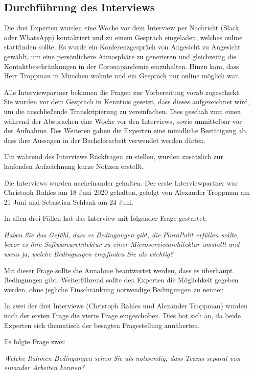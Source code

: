 \subsection{Durchführung des Interviews}

Die drei Experten wurden eine Woche vor dem Interview per Nachricht (Slack, oder WhatsApp) kontaktiert und zu einem Gespräch eingeladen, welches online stattfinden sollte. Es wurde ein Konferenzgespräch von Angesicht zu Angesicht gewählt, um eine persönlichere Atmosphäre zu generieren und gleichzeitig die Kontaktbeschränkungen in der Coronapandemie einzuhalten. Hinzu kam, dass Herr Troppman in München wohnte und ein Gespräch nur online möglich war.

Alle Interviewpartner bekamen die Fragen zur Vorbereitung vorab zugeschickt. Sie wurden vor dem Gespräch in Kenntnis gesetzt, dass dieses aufgezeichnet wird, um die anschließende Transkripierung zu vereinfachen. Dies geschah zum einen während der Absprachen eine Woche vor den Interviews, sowie unmittelbar vor der Aufnahme. Des Weiteren gaben die Experten eine mündliche Bestätigung ab, dass ihre Aussagen in der Bachelorarbeit verwendet werden dürfen.

Um während des Interviews Rückfragen zu stellen, wurden zusätzlich zur laufenden Aufzeichnung kurze Notizen erstellt.

Die Interviews wurden nacheinander gehalten. Der erste Interviewpartner war Christoph Rahles am 18 Juni 2020 gehalten, gefolgt von Alexander Troppman am 21 Juni und Sebastian Schlaak am 24 Juni.

In allen drei Fällen hat das Interview mit folgender Frage gestartet:

\textit{Haben Sie das Gefühl, dass es Bedingungen gibt, die PluraPolit erfüllen sollte, bevor es ihre Softwarearchitektur zu einer Microservicearchitektur umstellt und wenn ja, welche Bedingungen empfinden Sie als wichtig?}

Mit dieser Frage sollte die Annahme beantwortet werden, dass es überhaupt Bedingungen gibt. Weiterführend sollte den Experten die Möglichkeit gegeben werden, ohne jegliche Einschränkung notwendige Bedingungen zu nennen.

In zwei der drei Interviews (Christoph Rahles und Alexander Troppman) wurden nach der ersten Frage die vierte Frage eingeschoben. Dies bot sich an, da beide Experten sich thematisch der besagten Fragestellung annäherten.

Es folgte Frage zwei:

\textit{Welche Rahmen Bedingungen sehen Sie als notwendig, dass Teams separat von einander Arbeiten können?}


